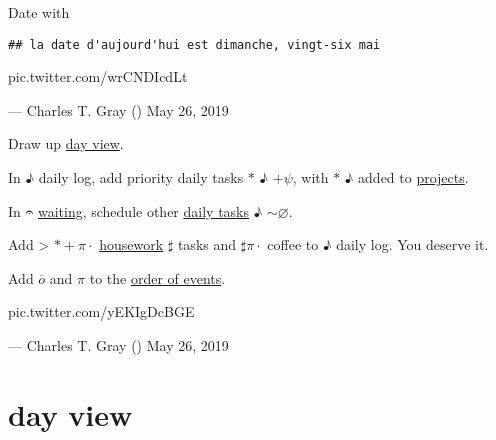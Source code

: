 \documentclass[]{book}
\newenvironment{Shaded}{\begin{snugshade}}{\end{snugshade}}
\newcommand{\CommentTok}[1]{\textcolor[rgb]{0.56,0.35,0.01}{\textit{#1}}}
\newcommand{\DataTypeTok}[1]{\textcolor[rgb]{0.13,0.29,0.53}{#1}}
\newcommand{\KeywordTok}[1]{\textcolor[rgb]{0.13,0.29,0.53}{\textbf{#1}}}
\newcommand{\NormalTok}[1]{#1}
\newcommand{\OperatorTok}[1]{\textcolor[rgb]{0.81,0.36,0.00}{\textbf{#1}}}
\newcommand{\StringTok}[1]{\textcolor[rgb]{0.31,0.60,0.02}{#1}}
\begin{document}
Date with

\begin{Shaded}
\end{Shaded}

\begin{verbatim}
## la date d'aujourd'hui est dimanche, vingt-six mai
\end{verbatim}

pic.twitter.com/wrCNDIcdLt

--- Charles T. Gray (\citet{cantabile}) May 26, 2019

Draw up \protect\hyperlink{dayview:day-view}{day view}.

In ♪ daily log, add priority daily tasks \(*\) ♪ \(+ \psi\), with \(*\) ♪ added to \protect\hyperlink{dayview:day-view}{projects}.

In 𝄐 \protect\hyperlink{dayview:day-view}{waiting}, schedule other \protect\hyperlink{daily-tasks}{daily tasks} ♪ \(\sim \varnothing\).

Add \textgreater{} \(*+\pi\cdot\) \protect\hyperlink{housework}{housework} \(\sharp\) tasks and \(\sharp \pi \cdot\) coffee to ♪ daily log. You deserve it.

Add \protect\hyperlink{review}{\(\overline o\)} and \(\pi\) to the \protect\hyperlink{dayview:order-of-events}{order of events}.

pic.twitter.com/yEKIgDcBGE

--- Charles T. Gray (\citet{cantabile}) May 26, 2019

\hypertarget{dayview:day-view}{%
\section{day view}\label{dayview:day-view}}

\begin{Shaded}
\end{Shaded}
\end{document}
